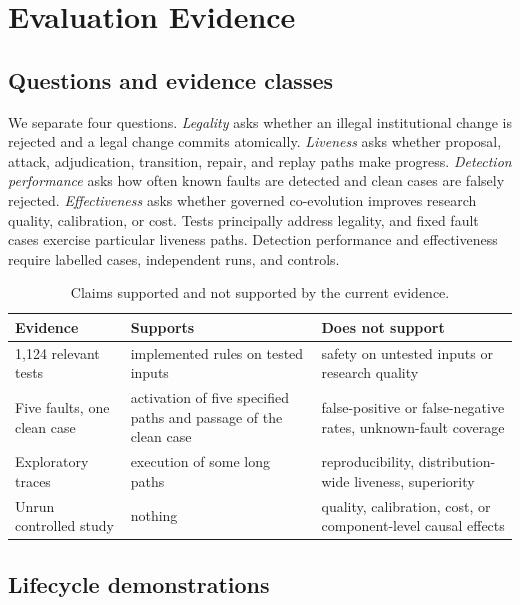 \section{Evaluation Evidence}\label{chapter:eval}

\subsection{Questions and evidence classes}\label{sec:eval:sample}

We separate four questions. \emph{Legality} asks whether an illegal
institutional change is rejected and a legal change commits atomically.
\emph{Liveness} asks whether proposal, attack, adjudication, transition,
repair, and replay paths make progress. \emph{Detection performance} asks
how often known faults are detected and clean cases are falsely rejected.
\emph{Effectiveness} asks whether governed co-evolution improves research
quality, calibration, or cost. Tests principally address legality, and
fixed fault cases exercise particular liveness paths. Detection
performance and effectiveness require labelled cases, independent runs,
and controls.

\begin{table}[t]
  \centering
  \small
  \begin{tabularx}{\columnwidth}{@{}lXX@{}}
    \toprule
    \textbf{Evidence} & \textbf{Supports} & \textbf{Does not support} \\
    \midrule
    1,124 relevant tests & implemented rules on tested inputs &
      safety on untested inputs or research quality \\
    Five faults, one clean case & activation of five specified paths and
      passage of the clean case &
      false-positive or false-negative rates, unknown-fault coverage \\
    Exploratory traces & execution of some long paths &
      reproducibility, distribution-wide liveness, superiority \\
    Unrun controlled study & nothing &
      quality, calibration, cost, or component-level causal effects \\
    \bottomrule
  \end{tabularx}
  \caption{Claims supported and not supported by the current evidence.}
  \label{tab:eval-status}
\end{table}

\subsection{Lifecycle demonstrations}\label{sec:eval:construction}

